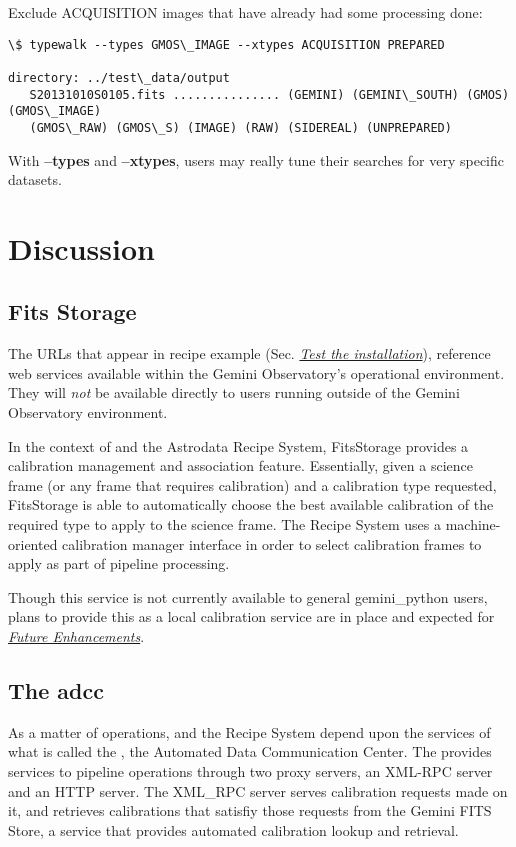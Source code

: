 \documentclass[letterpaper,10pt,english]{sphinxmanual}
\begin{document}
Exclude ACQUISITION images that have already had some processing done:

\begin{Verbatim}[commandchars=\\\{\}]
\$ typewalk --types GMOS\_IMAGE --xtypes ACQUISITION PREPARED

directory: ../test\_data/output
   S20131010S0105.fits ............... (GEMINI) (GEMINI\_SOUTH) (GMOS) (GMOS\_IMAGE)
   (GMOS\_RAW) (GMOS\_S) (IMAGE) (RAW) (SIDEREAL) (UNPREPARED)
\end{Verbatim}

With \textbf{--types} and \textbf{--xtypes}, users may really tune their searches for very
specific datasets.


\chapter{Discussion}
\label{discuss:discussion}\label{discuss::doc}

\section{Fits Storage}
\label{discuss:fits-storage}\label{discuss:fitsstore}
The URLs that appear in  recipe example (Sec. {\hyperref[userenv:test]{\emph{Test the installation}}}), reference web services
available within the Gemini Observatory's operational environment. They will
\emph{not} be available directly to users running  outside of the Gemini
Observatory environment.

In the context of  and the Astrodata Recipe System, FitsStorage provides
a calibration management and association feature. Essentially, given a science
frame (or any frame that requires calibration) and a calibration
type requested, FitsStorage is able to automatically choose the best available
calibration of the required type to apply to the science frame. The Recipe System
uses a machine-oriented calibration manager interface in order to select
calibration frames to apply as part of pipeline processing.

Though this service is not currently available to general gemini\_python users,
plans to provide this as a local calibration service are in place and expected
for {\hyperref[discuss:future]{\emph{Future Enhancements}}}.


\section{The adcc}
\label{discuss:adcc}\label{discuss:the-adcc}
As a matter of operations,  and the Recipe System depend upon the
services of what is called the , the Automated Data Communication Center.
The  provides services to pipeline operations through two proxy servers,
an XML-RPC server and an HTTP server. The XML\_RPC server serves calibration
requests made on it, and retrieves calibrations that satisfiy those requests
from the Gemini FITS Store, a service that provides automated calibration
lookup and retrieval.
\end{document}
